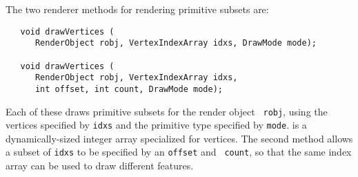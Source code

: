 The two renderer methods for rendering primitive subsets are:
%
\begin{lstlisting}
   void drawVertices (
      RenderObject robj, VertexIndexArray idxs, DrawMode mode);

   void drawVertices (
      RenderObject robj, VertexIndexArray idxs, 
      int offset, int count, DrawMode mode);
\end{lstlisting}
%
Each of these draws primitive subsets for the render object {\tt
robj}, using the vertices specified by {\tt idxs} and the primitive
type specified by {\tt mode}.
 is a dynamically-sized
integer array specialized for vertices.  The second method allows a
subset of {\tt idxs} to be specified by an {\tt offset} and {\tt
count}, so that the same index array can be used to draw different
features.

